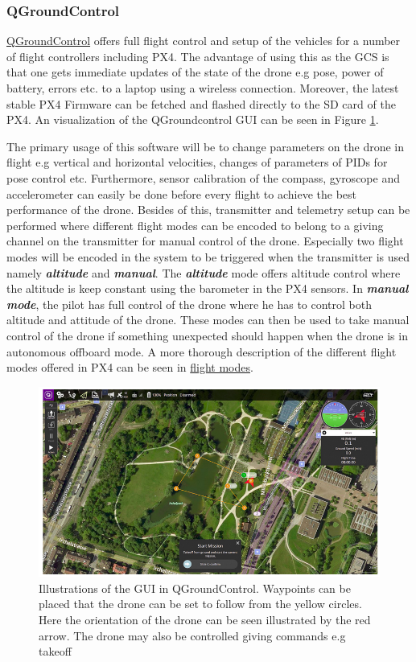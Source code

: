 \documentclass[../Head/report.tex]{subfiles}
\begin{document}
\subsubsection{QGroundControl}
\label{sec:qgroundcontrol}

\href{https://docs.qgroundcontrol.com/master/en/}{QGroundControl} offers full flight control and setup of the vehicles for a number of flight controllers including PX4. The advantage of using this as the GCS is that one gets immediate updates of the state of the drone e.g pose, power of battery, errors etc. to a laptop using a wireless connection.  Moreover, the latest stable PX4 Firmware can be fetched and flashed directly to the SD card of the PX4. An visualization of the QGroundcontrol GUI can be seen in Figure \ref{fig:qgroundcontrol}.

The primary usage of this software will be to change parameters on the drone in flight e.g vertical and horizontal velocities, changes of parameters of PIDs for pose control etc. Furthermore, sensor calibration of the compass, gyroscope and accelerometer can easily be done before every flight to achieve the best performance of the drone. Besides of this, transmitter and telemetry setup can be performed where different flight modes can be encoded to belong to a giving channel on the transmitter for manual control of the drone. Especially two flight modes will be encoded in the system to be triggered when the transmitter is used namely \textit{\textbf{altitude}} and \textit{\textbf{manual}}. The \textit{\textbf{altitude}} mode offers altitude control where the altitude is keep constant using the barometer in the PX4 sensors. In \textit{\textbf{manual mode}}, the pilot has full control of the drone where he has to control both altitude and attitude of the drone. These modes can then be used to take manual control of the drone if something unexpected should happen when the drone is in autonomous offboard mode. A more thorough description of the different flight modes offered in PX4 can be seen in \href{https://docs.px4.io/v1.9.0/en/flight_modes/}{flight modes}.

\begin{figure}[H]
    \centering
    \includegraphics[width=0.7\linewidth]{../Figures/qgroundcontrol.png}
    \caption{Illustrations of the GUI in QGroundControl. Waypoints can be placed that the drone can be set to follow from the yellow circles. Here the orientation of the drone can be seen illustrated by the red arrow. The drone may also be controlled giving commands e.g takeoff}
    \label{fig:qgroundcontrol}
\end{figure}
\end{document}
